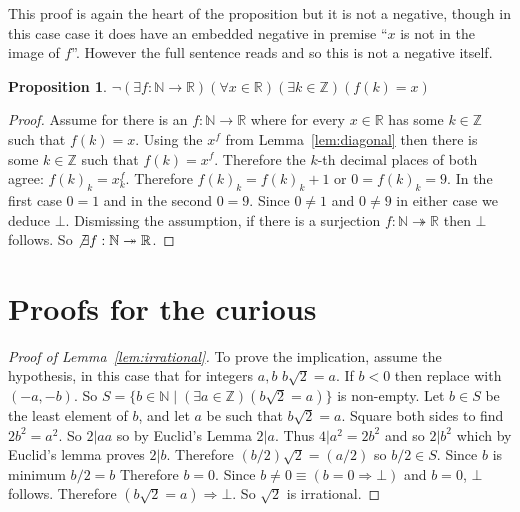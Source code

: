 \documentclass{amsart}
\newtheorem{prop}[thm]{Proposition}
\begin{document}
This proof is again the heart of the proposition but it is not a negative, 
though in this case case it does have an embedded negative in premise 
``$x$ is not in the image of $f$''.  However the full sentence reads 
 and so this is not a negative itself.

\begin{prop}
    $\neg (\exists f:\mathbb{N}\to \mathbb{R})(\forall x\in \mathbb{R})(\exists k\in\mathbb{Z})(f(k)=x)$
\end{prop}
\begin{proof}
    Assume for there is an $f:\mathbb{N}\to \mathbb{R}$ where 
    for every $x\in\mathbb{R}$ has some $k\in \mathbb{Z}$ such that $f(k)=x$.
    Using the $x^f$ from Lemma~\ref{lem:diagonal} then there is 
    some $k\in \mathbb{Z}$ such that $f(k)=x^f$.  Therefore 
    the $k$-th decimal places of both agree: $f(k)_k = x^f_k$.
    Therefore $f(k)_k=f(k)_k+1$ or $0=f(k)_k=9$.
    In the first case $0=1$ and in the second $0=9$.
    Since $0\neq 1$ and $0\neq 9$ in either case we deduce $\bot$.
    Dismissing the assumption, if there is a surjection $f:\mathbb{N}\twoheadrightarrow \mathbb{R}$
    then $\bot$ follows.  So $\not\exists f:\mathbb{N}\twoheadrightarrow \mathbb{R}$.
\end{proof}

\appendix

\section{Proofs for the curious}


\begin{proof}[Proof of Lemma~\ref{lem:irrational}]
    To prove the implication, assume the hypothesis, in this case 
    that for integers $a,b$ $b\sqrt{2}=a$.
    If $b<0$ then replace with $(-a,-b)$.
    So $S=\{b\in \mathbb{N}\mid (\exists a\in \mathbb{Z})(b\sqrt{2}=a)\}$
    is non-empty.  Let $b\in S$ be the least element of $b$, and 
    let $a$ be such that $b\sqrt{2}=a$.
    Square both sides to find $2b^2=a^2$.  So $2|aa$ so by Euclid's 
    Lemma $2|a$. Thus $4|a^2=2b^2$ and so $2|b^2$ which by 
    Euclid's lemma proves $2|b$.  Therefore $(b/2)\sqrt{2}=(a/2)$ 
    so $b/2\in S$.  Since $b$ is minimum $b/2=b$  Therefore 
    $b=0$.  Since $b\neq 0\equiv (b=0\Rightarrow \bot)$ and $b=0$,
    $\bot$ follows.  Therefore $(b\sqrt{2}=a)\Rightarrow \bot$.
    So $\sqrt{2}$ is irrational.
\end{proof}
\end{document}
